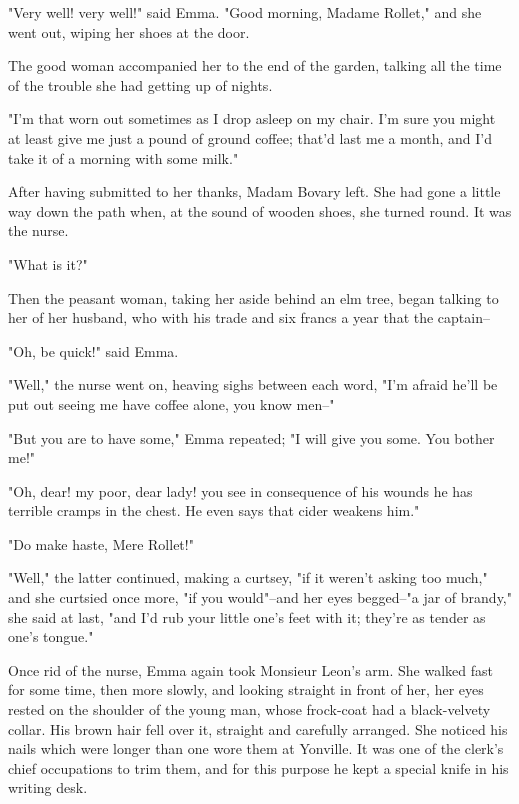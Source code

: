 \documentclass{tufte-book}
\begin{document}
"Very well! very well!" said Emma. "Good morning, Madame Rollet," and
she went out, wiping her shoes at the door.

The good woman accompanied her to the end of the garden, talking all the
time of the trouble she had getting up of nights.

"I'm that worn out sometimes as I drop asleep on my chair. I'm sure you
might at least give me just a pound of ground coffee; that'd last me a
month, and I'd take it of a morning with some milk."

After having submitted to her thanks, Madam Bovary left. She had gone a
little way down the path when, at the sound of wooden shoes, she turned
round. It was the nurse.

"What is it?"

Then the peasant woman, taking her aside behind an elm tree, began
talking to her of her husband, who with his trade and six francs a year
that the captain--

"Oh, be quick!" said Emma.

"Well," the nurse went on, heaving sighs between each word, "I'm afraid
he'll be put out seeing me have coffee alone, you know men--"

"But you are to have some," Emma repeated; "I will give you some. You
bother me!"

"Oh, dear! my poor, dear lady! you see in consequence of his wounds he
has terrible cramps in the chest. He even says that cider weakens him."

"Do make haste, Mere Rollet!"

"Well," the latter continued, making a curtsey, "if it weren't asking
too much," and she curtsied once more, "if you would"--and her eyes
begged--"a jar of brandy," she said at last, "and I'd rub your little
one's feet with it; they're as tender as one's tongue."

Once rid of the nurse, Emma again took Monsieur Leon's arm. She walked
fast for some time, then more slowly, and looking straight in front of
her, her eyes rested on the shoulder of the young man, whose frock-coat
had a black-velvety collar. His brown hair fell over it, straight and
carefully arranged. She noticed his nails which were longer than one
wore them at Yonville. It was one of the clerk's chief occupations to
trim them, and for this purpose he kept a special knife in his writing
desk.
\end{document}
